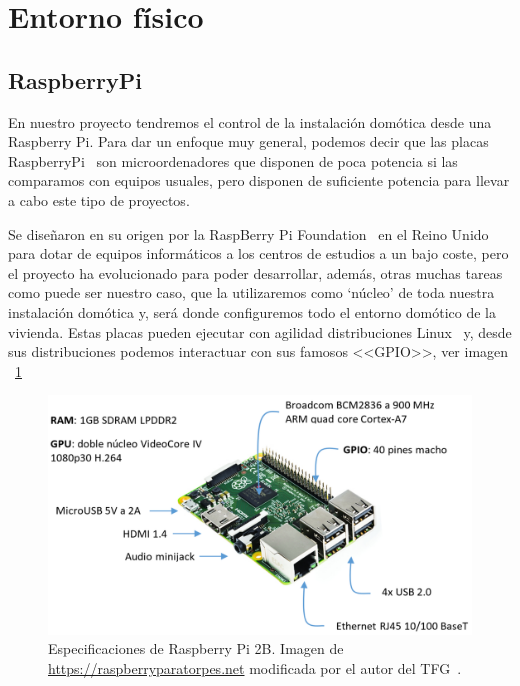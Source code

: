 \section{Entorno físico}
\subsection{RaspberryPi}\label{4:RaspberryPi}
En nuestro proyecto tendremos el control de la instalación domótica desde una Raspberry Pi\cite{misc:RbPWeb}. 
Para dar un enfoque muy general, podemos decir que las placas RaspberryPi~\cite{misc:RbPWeb} son microordenadores que disponen de poca potencia si las comparamos con equipos usuales, pero disponen de suficiente potencia para llevar a cabo este tipo de proyectos.

Se diseñaron en su origen por la RaspBerry Pi Foundation~\cite{misc:RbPWeb} en el Reino Unido para dotar de equipos informáticos a los centros de estudios a un bajo coste, pero el proyecto ha evolucionado para poder desarrollar, además, otras muchas tareas como puede ser nuestro caso, que la utilizaremos como ‘núcleo’ de toda nuestra instalación domótica y, será donde configuremos todo el entorno domótico de la vivienda.
Estas placas pueden ejecutar con agilidad distribuciones Linux~\cite{misc:Linux} y, desde sus distribuciones podemos interactuar con sus famosos <<GPIO>>, ver imagen ~\ref{Img:Especificaciones RBP2B}

\begin{figure}
    \centering
    \includegraphics[width=\textwidth]{img/RBP2B.pdf}
    \caption[Especificaciones de Raspberry Pi 2B]{Especificaciones de Raspberry Pi 2B. Imagen de \url{https://raspberryparatorpes.net} modificada por el autor del TFG~\cite{wiki:Creative}. }\label{Img:Especificaciones RBP2B}
\end{figure}

